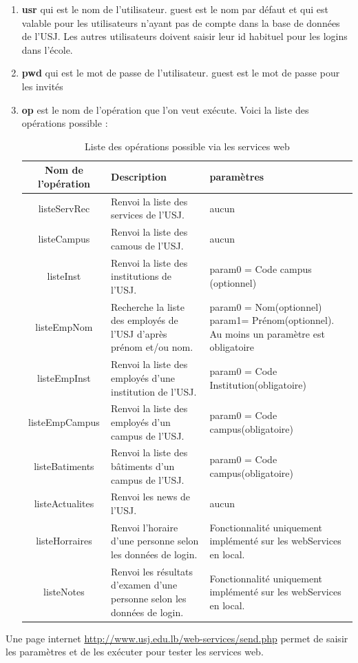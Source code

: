 	\begin{enumerate}
	\item \textbf{usr} qui est le nom de l'utilisateur. guest est le nom par défaut et qui est valable pour les utilisateurs n'ayant pas de compte dans la base de données de l'USJ. Les autres utilisateurs doivent saisir leur id habituel pour les logins dans l'école. 
	\item \textbf{pwd} qui est le mot de passe de l'utilisateur. guest est le mot de passe pour les invités
	\item \textbf{op} est le nom de l'opération que l'on veut exécute. 	Voici la liste des opérations possible : 
	\begin{table}[H]
	\centering
	\begin{tabular}{|c|p{4cm}|p{7cm}|}
	\hline \textbf{Nom de l'opération }& \textbf{Description} & \textbf{paramètres}  \\ 
	\hline listeServRec & Renvoi la liste des services de l'USJ. & aucun \\ 
	\hline listeCampus & Renvoi la liste des camous de l'USJ. & aucun \\ 
	\hline listeInst & Renvoi la liste des institutions de l'USJ. & param0 = Code campus (optionnel) \\ 
	\hline listeEmpNom & Recherche la liste des employés de l'USJ d'après prénom et/ou nom. & param0 = Nom(optionnel)  param1= Prénom(optionnel). Au moins un paramètre est obligatoire  \\ 
	\hline listeEmpInst & Renvoi la liste des employés d'une institution de l'USJ. & param0 = Code Institution(obligatoire)   \\
	\hline listeEmpCampus & Renvoi la liste des employés d'un campus de l'USJ. & param0 = Code campus(obligatoire)  \\
	\hline listeBatiments & Renvoi la liste des bâtiments d'un campus de l'USJ. & param0 = Code campus(obligatoire)  \\
	\hline listeActualites & Renvoi les news de l'USJ. &aucun  \\
	\hline \color{red}listeHorraires & \color{red}Renvoi l'horaire d'une personne selon les données de login. & \color{red} Fonctionnalité uniquement implémenté sur les webServices en local.  \\
	\hline \color{red}listeNotes & \color{red}Renvoi les résultats d'examen d'une personne selon les données de login. & \color{red} Fonctionnalité uniquement implémenté sur les webServices en local.  \\
	\hline 
	\end{tabular} 
		\caption{Liste des opérations possible via les services web}
	\end{table}
	\end{enumerate}
	Une page internet \url{http://www.usj.edu.lb/web-services/send.php} permet de saisir les paramètres et de les exécuter pour tester les services web.
	
